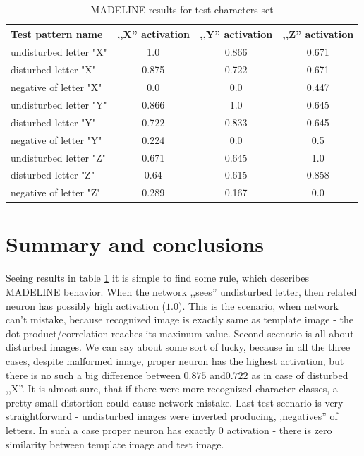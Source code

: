 \documentclass{classrep}
\begin{document}
{        \begin{table}[!htbp]
            \centering
            \begin{tabular}{|l|c|c|c|}
                \hline
                Test pattern name & ,,X'' activation & ,,Y'' activation & ,,Z''
                activation \\ \hline
                undisturbed letter "X" & 1.0 & 0.866 & 0.671 \\
                disturbed letter "X" & 0.875 & 0.722 & 0.671 \\
                negative of letter "X" & 0.0 & 0.0 & 0.447 \\
                undisturbed letter "Y" & 0.866 & 1.0 & 0.645 \\
                disturbed letter "Y" & 0.722 & 0.833 & 0.645 \\
                negative of letter "Y" & 0.224 & 0.0 & 0.5 \\
                undisturbed letter "Z" & 0.671 & 0.645 & 1.0 \\
                disturbed letter "Z" & 0.64 & 0.615 & 0.858 \\
                negative of letter "Z" & 0.289 & 0.167 & 0.0 \\ \hline
            \end{tabular}
            \caption{MADELINE results for test characters set}
            \label{tab:results}
        \end{table}
        \FloatBarrier
    }

    \section{Summary and conclusions}
    \label{summary} {
        Seeing results in table \ref{tab:results} it is simple to find some rule, which
        describes MADELINE behavior. When the network ,,sees'' undisturbed letter, then
        related neuron has possibly high activation ($1.0$). This is the scenario, when
        network can't mistake, because recognized image is exactly same as template
        image - the dot product/correlation reaches its maximum value. Second scenario
        is all about disturbed images. We can say about some sort of lucky, because in
        all the three cases, despite malformed image, proper neuron has the highest
        activation, but there is no such a big difference between $0.875$ and$0.722$ as in
        case of disturbed ,,X''. It is almost sure, that if there were more recognized
        character classes, a pretty small distortion could cause network mistake. Last
        test scenario is very straightforward - undisturbed images were inverted
        producing, ,negatives'' of letters. In such a case proper neuron has exactly
        $0$ activation - there is zero similarity between template image and test image.
    }

    \begin{thebibliography}{0}
    \end{thebibliography}
\end{document}
